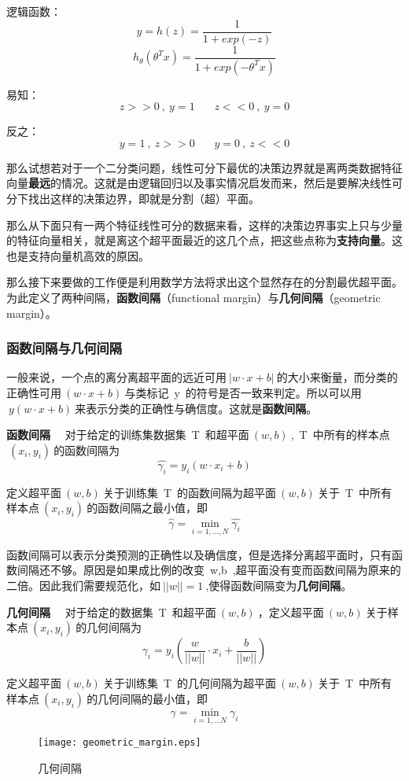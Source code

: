 逻辑函数：$$y=h(z)=\frac{1}{1+exp(-z)}$$$$h_\theta(\theta^T x)=\frac{1}{1+exp(-\theta^Tx)}$$

易知：$$z>>0~,~y=1~~~~~~~~z<<0~,~y=0$$



反之：$$y=1~,~z>>0~~~~~~~~y=0~,~z<<0$$

那么试想若对于一个二分类问题，线性可分下最优的决策边界就是离两类数据特征向量\textbf{最远}的情况。这就是由逻辑回归以及事实情况启发而来，然后是要解决线性可分下找出这样的决策边界，即就是分割（超）平面。

那么从下面只有一两个特征线性可分的数据来看，这样的决策边界事实上只与少量的特征向量相关，就是离这个超平面最近的这几个点，把这些点称为\textbf{支持向量}。这也是支持向量机高效的原因。

那么接下来要做的工作便是利用数学方法将求出这个显然存在的分割最优超平面。为此定义了两种间隔，\textbf{函数间隔}（functional margin）与\textbf{几何间隔}（geometric margin）。

\subsubsection{函数间隔与几何间隔}
一般来说，一个点的离分离超平面的远近可用$~|w\cdot x+b|~$的大小来衡量，而分类的正确性可用$~(w\cdot x+b)~$与类标记~y~的符号是否一致来判定。所以可以用$~y(w\cdot x+b)~$来表示分类的正确性与确信度。这就是\textbf{函数间隔}。

\textbf{函数间隔} ~~对于给定的训练集数据集~T~和超平面$~(w,b)~$,~T~中所有的样本点$~(x_i,y_i)~$的函数间隔为
$$\hat{\gamma_i}=y_i(w\cdot x_i+b)$$

定义超平面$~(w,b)~$关于训练集~T~的函数间隔为超平面$~(w,b)~$关于~T~中所有样本点$~(x_i,y_i)~$的函数间隔之最小值，即
$$\hat{\gamma} = \min \limits_{i=1,...,N} \hat{\gamma_i}$$


函数间隔可以表示分类预测的正确性以及确信度，但是选择分离超平面时，只有函数间隔还不够。原因是如果成比例的改变~w,b~,超平面没有变而函数间隔为原来的二倍。因此我们需要规范化，如$~||w||=1~$,使得函数间隔变为\textbf{几何间隔}。

\textbf{几何间隔} ~~对于给定的数据集~T~和超平面$~(w,b)~$，定义超平面$~(w,b)~$关于样本点$~(x_i,y_i)~$的几何间隔为
$$\gamma_i = y_i(\frac{w}{||w||}\cdot x_i+\frac{b}{||w||})$$

定义超平面$~(w,b)~$关于训练集~T~的几何间隔为超平面$~(w,b)~$关于~T~中所有样本点$~(x_i,y_i)~$的几何间隔的最小值，即
$$\gamma = \min \limits_{i=1,...N} \gamma_i$$

\begin{figure}[!htb]
  \centering
  \texttt{[image: geometric\_margin.eps]}
  \caption{几何间隔}
\end{figure}

